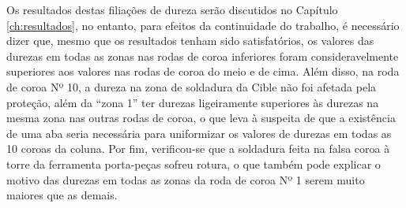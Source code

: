 \par
Os resultados destas filiações de dureza serão discutidos no Capítulo \ref{ch:resultados}, no entanto, para efeitos da continuidade do trabalho, é necessário dizer que, mesmo que os resultados tenham sido satisfatórios, os valores das durezas em todas as zonas nas rodas de coroa inferiores foram consideravelmente superiores aos valores nas rodas de coroa do meio e de cima. Além disso, na roda de coroa Nº 10, a dureza na zona de soldadura da Cible não foi afetada pela proteção, além da “zona 1” ter durezas ligeiramente superiores às durezas na mesma zona nas outras rodas de coroa, o que leva à suspeita de que a existência de uma aba seria necessária para uniformizar os valores de durezas em todas as 10 coroas da coluna. Por fim, verificou-se que a soldadura feita na falsa coroa à torre da ferramenta porta-peças sofreu rotura, o que também pode explicar o motivo das durezas em todas as zonas da roda de coroa Nº 1 serem muito maiores que as demais.
